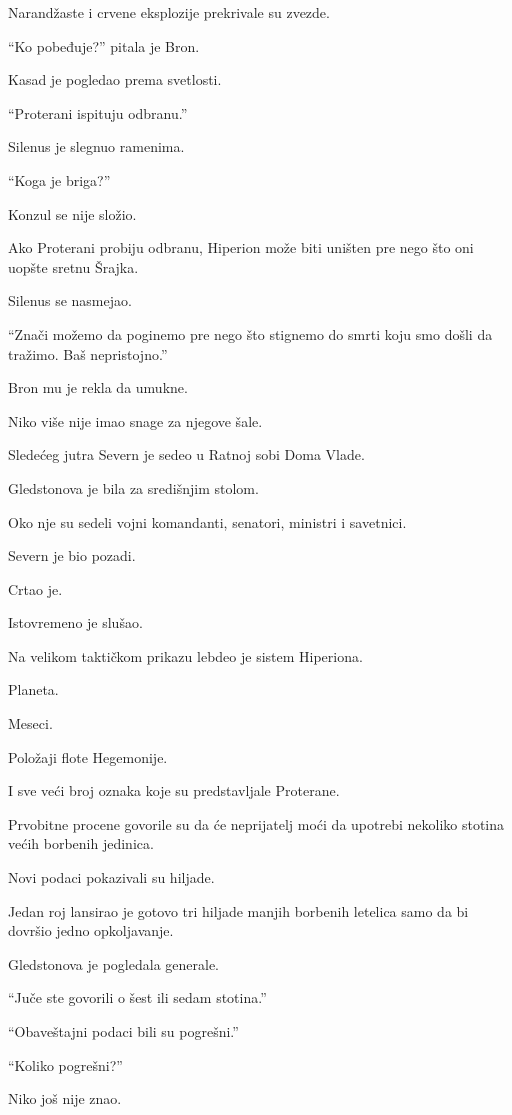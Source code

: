 Narandžaste i crvene eksplozije prekrivale su zvezde.

``Ko pobeđuje?'' pitala je Bron.

Kasad je pogledao prema svetlosti.

``Proterani ispituju odbranu.''

Silenus je slegnuo ramenima.

``Koga je briga?''

Konzul se nije složio.

Ako Proterani probiju odbranu, Hiperion može biti uništen pre nego što oni uopšte sretnu Šrajka.

Silenus se nasmejao.

``Znači možemo da poginemo pre nego što stignemo do smrti koju smo došli da tražimo. Baš nepristojno.''

Bron mu je rekla da umukne.

Niko više nije imao snage za njegove šale.

\bigskip

Sledećeg jutra Severn je sedeo u Ratnoj sobi Doma Vlade.

Gledstonova je bila za središnjim stolom.

Oko nje su sedeli vojni komandanti, senatori, ministri i savetnici.

Severn je bio pozadi.

Crtao je.

Istovremeno je slušao.

Na velikom taktičkom prikazu lebdeo je sistem Hiperiona.

Planeta.

Meseci.

Položaji flote Hegemonije.

I sve veći broj oznaka koje su predstavljale Proterane.

Prvobitne procene govorile su da će neprijatelj moći da upotrebi nekoliko stotina većih borbenih jedinica.

Novi podaci pokazivali su hiljade.

Jedan roj lansirao je gotovo tri hiljade manjih borbenih letelica samo da bi dovršio jedno opkoljavanje.

Gledstonova je pogledala generale.

``Juče ste govorili o šest ili sedam stotina.''

``Obaveštajni podaci bili su pogrešni.''

``Koliko pogrešni?''

Niko još nije znao.

